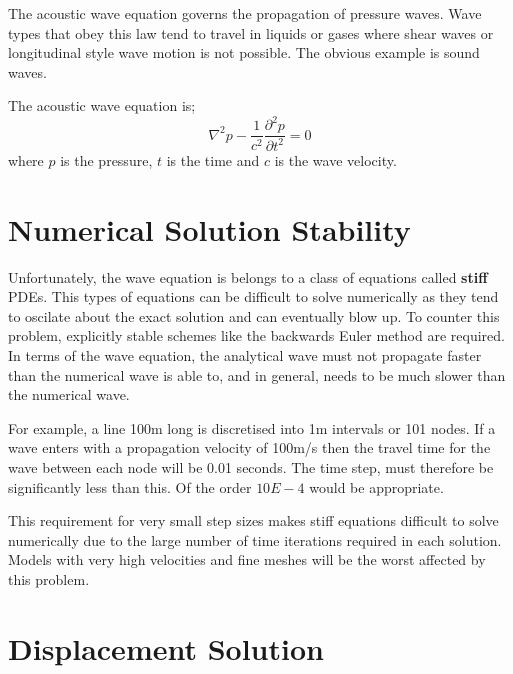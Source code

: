 
%
%
%



The acoustic wave equation governs the propagation of pressure waves. Wave
types that obey this law tend to travel in liquids or gases where shear waves
or longitudinal style wave motion is not possible. The obvious example is sound
waves.

The acoustic wave equation is;
\begin{equation}
 \nabla ^2 p - \frac{1}{c^2} \frac{\partial ^2 p}{\partial t^2} = 0
\label{eqn:acswave}
\end{equation}
where $p$ is the pressure, $t$ is the time and $c$ is the wave velocity.



\section{Numerical Solution Stability}
Unfortunately, the wave equation is belongs to a class of equations called
\textbf{stiff} PDEs. This types of equations can be difficult to solve
numerically as they tend to oscilate about the exact solution and can
eventually blow up. To counter this problem, explicitly stable schemes like the
backwards Euler method are required. In terms of the wave equation, the
analytical wave must not propagate faster than the numerical wave is able to,
and in general, needs to be much slower than the numerical wave.

For example, a line 100m long is discretised into 1m intervals or 101 nodes. If
a wave enters with a propagation velocity of 100m/s then the travel time for
the wave between each node will be 0.01 seconds. The time step, must therefore
be significantly less than this. Of the order $10E-4$ would be appropriate. 

This requirement for very small step sizes makes stiff equations difficult to
solve numerically due to the large number of time iterations required in each
solution. Models with very high velocities and fine meshes will be the worst
affected by this problem.


\section{Displacement Solution}

